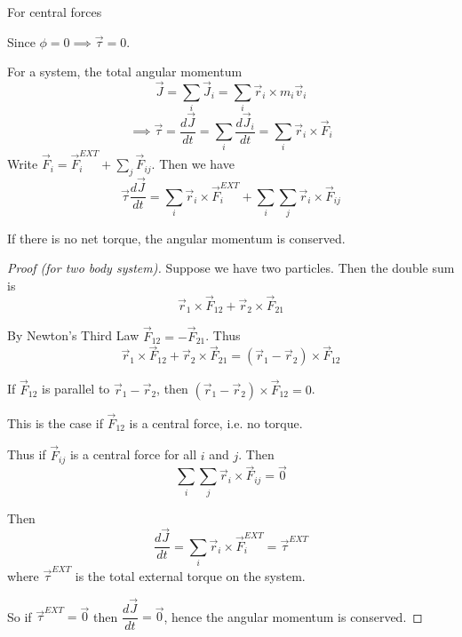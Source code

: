 For central forces 
\vspace*{50pt}

Since $\phi = 0 \implies \vec{\tau} = 0$. 

For a system, the total angular momentum
\[\vec{J} = \sum_{i}\vec{J}_i = \sum_i\vec{r}_i \times m_i \vec{v}_i\]
\[\implies \vec{\tau} = \frac{d\vec{J}}{dt} = \sum_i\dfrac{d\vec{J}_i}{dt} = \sum_i\vec{r}_i\times\vec{F}_i\]
Write $\vec{F}_i = \vec{F}_i^{EXT} + \sum_j\vec{F}_{ij}$. Then we have
\begin{equation} \vec{\tau} \frac{d\vec{J}}{dt} = \sum_i\vec{r}_i\times\vec{F}_i^{EXT} + \sum_i\sum_j\vec{r}_i\times\vec{F}_{ij}\end{equation}


\begin{theorem}
If there is no net torque, the angular momentum is conserved.
\end{theorem}

\begin{proof}[Proof (for two body system)]

Suppose we have two particles. Then the double sum is 
\[\vec{r}_1 \times\vec{F}_{12} +\vec{r}_2 \times\vec{F}_{21} \]

By Newton's Third Law $\vec{F}_{12} = -\vec{F}_{21}$. Thus
\[\vec{r}_1 \times\vec{F}_{12} +\vec{r}_2 \times\vec{F}_{21} = (\vec{r}_1 - \vec{r}_2) \times \vec{F}_{12}\]

If $\vec{F}_{12}$ is parallel to $\vec{r}_1 - \vec{r}_2$, then $(\vec{r}_1 - \vec{r}_2) \times \vec{F}_{12} = 0$. 

This is the case if $\vec{F}_{12}$ is a central force, i.e. no torque. 

Thus if $\vec{F}_{ij}$ is a central force for all $i$ and $j$. Then 
\[\sum_i\sum_j \vec{r}_i \times \vec{F}_{ij} = \vec{0}\]

Then 
\[\frac{d\vec{J}}{dt} = \sum_i\vec{r}_i \times \vec{F}_i^{EXT} = \vec{\tau}^{EXT}\]
where $\vec{\tau}^{EXT}$ is the total external torque on the system.

So if $\vec{\tau}^{EXT} = \vec{0}$ then $\dfrac{d\vec{J}}{dt} = \vec{0}$, hence the angular momentum is conserved.
\end{proof}

